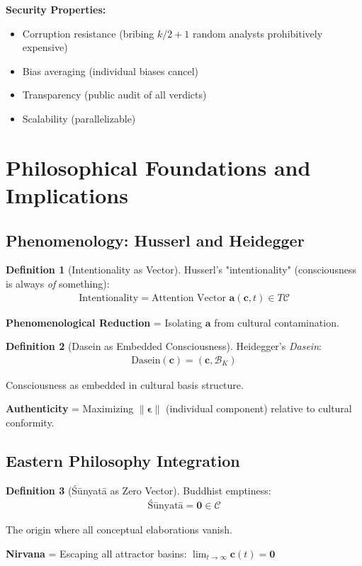 \documentclass[11pt,a4paper]{article}
\theoremstyle{definition}
\newtheorem{definition}{Definition}[section]
\theoremstyle{remark}
\newcommand{\CC}{\mathcal{C}}
\newcommand{\cc}{\mathbf{c}}
\begin{document}
\textbf{Security Properties:}
\begin{itemize}
\item Corruption resistance (bribing $k/2 + 1$ random analysts prohibitively expensive)
\item Bias averaging (individual biases cancel)
\item Transparency (public audit of all verdicts)
\item Scalability (parallelizable)
\end{itemize}

\section{Philosophical Foundations and Implications}

\subsection{Phenomenology: Husserl and Heidegger}

\begin{definition}[Intentionality as Vector]
Husserl's "intentionality" (consciousness is always \textit{of} something):
\begin{align}
\text{Intentionality} = \text{Attention Vector } \mathbf{a}(\cc, t) \in T\CC
\end{align}

\textbf{Phenomenological Reduction} = Isolating $\mathbf{a}$ from cultural contamination.
\end{definition}

\begin{definition}[Dasein as Embedded Consciousness]
Heidegger's \textit{Dasein}:
\begin{align}
\text{Dasein}(\cc) = \left(\cc, \mathcal{B}_K\right)
\end{align}

Consciousness as embedded in cultural basis structure.

\textbf{Authenticity} = Maximizing $\|\boldsymbol{\epsilon}\|$ (individual component) relative to cultural conformity.
\end{definition}

\subsection{Eastern Philosophy Integration}

\begin{definition}[Śūnyatā as Zero Vector]
Buddhist emptiness:
\begin{align}
\text{Śūnyatā} = \mathbf{0} \in \CC
\end{align}

The origin where all conceptual elaborations vanish.

\textbf{Nirvana} = Escaping all attractor basins: $\lim_{t \to \infty} \cc(t) = \mathbf{0}$
\end{definition}
\end{document}
